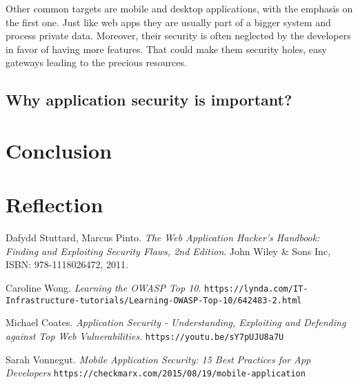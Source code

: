 \documentclass[a4paper]{article}
\begin{document}
Other common targets are mobile and desktop applications, with the emphasis on the first one. Just like web apps they are usually part of a bigger system and process private data. Moreover, their security is often neglected by the developers in favor of having more features. That could make them security holes, easy gateways leading to the precious resources. 

\subsection{Why application security is important?}

\section{Conclusion}

\section{Reflection}

\begin{thebibliography}{9}

		Dafydd Stuttard, Marcus Pinto.
		\textit{The Web Application Hacker's Handbook: Finding and Exploiting Security Flaws, 2nd Edition}.
		John Wiley \& Sons Inc, ISBN: 978-1118026472, 2011.

		Caroline Wong.
		\textit{Learning the OWASP Top 10}.
		\texttt{https://lynda.com/IT-\allowbreak{}Infrastructure-tutorials/Learning-OWASP-Top-10/642483-2.html}
		
		Michael Coates.
		\textit{Application Security - Understanding, Exploiting and Defending against Top Web Vulnerabilities}.
		\texttt{https://youtu.be/sY7pUJU8a7U}

		Sarah Vonnegut.
		\textit{Mobile Application Security: 15 Best Practices for App Developers}
		\texttt{https://checkmarx.com/2015/08/19/mobile-application}
\end{thebibliography}
\end{document}
